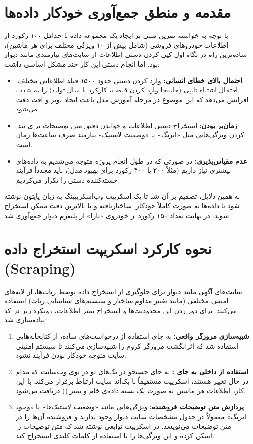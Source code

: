 \documentclass[12pt, a4paper]{article}
\begin{document}
	\section{مقدمه و منطق جمع‌آوری خودکار داده‌ها}
	با توجه به خواسته تمرین مبنی بر ایجاد یک مجموعه داده با حداقل ۱۰۰ رکورد از اطلاعات خودروهای فروشی (شامل بیش از ۱۰ ویژگی مختلف برای هر ماشین)، ساده‌ترین راه در نگاه اول کپی کردن دستی اطلاعات از سایت‌های نیازمندی مانند دیوار بود. اما انجام دستی این کار چند مشکل اساسی داشت:
	\begin{itemize}
		\item \textbf{احتمال بالای خطای انسانی:} وارد کردن دستی حدود ۱۵۰۰ فیلد اطلاعاتی مختلف، احتمال اشتباه تایپی (جابه‌جا وارد کردن قیمت، کارکرد یا سال تولید) را به شدت افزایش می‌دهد که این موضوع در مرحله آموزش مدل باعث ایجاد نویز و افت دقت می‌شود.
		\item \textbf{زمان‌بر بودن:} استخراج دستی اطلاعات و خواندن دقیق متن توضیحات برای پیدا کردن ویژگی‌هایی مثل «ایربگ» یا «وضعیت لاستیک» نیازمند صرف ساعت‌ها زمان است.
		\item \textbf{عدم مقیاس‌پذیری:} در صورتی که در طول انجام پروژه متوجه می‌شدیم به داده‌های بیشتری نیاز داریم (مثلاً ۲۰۰ یا ۳۰۰ رکورد برای بهبود مدل)، باید مجدداً فرآیند خسته‌کننده دستی را تکرار می‌کردیم.
	\end{itemize}
	به همین دلایل، تصمیم بر آن شد تا یک اسکریپت وب‌اسکریپینگ به زبان پایتون نوشته شود تا داده‌ها به صورت کاملاً خودکار، ساختاریافته و با بالاترین دقت ممکن استخراج شوند. در نهایت تعداد ۱۵۰ رکورد از خودروی «تارا» از پلتفرم دیوار جمع‌آوری شد.
	
	\section{نحوه کارکرد اسکریپت استخراج داده (Scraping)}
	سایت‌های آگهی مانند دیوار برای جلوگیری از استخراج داده توسط ربات‌ها، از لایه‌های امنیتی مختلفی (مانند تغییر مداوم ساختار  و سیستم‌های شناسایی ربات) استفاده می‌کنند. برای دور زدن این محدودیت‌ها و استخراج تمیز اطلاعات، رویکرد زیر در کد پیاده‌سازی شد:
	
	\begin{enumerate}
		\item \textbf{شبیه‌سازی مرورگر واقعی:} به جای استفاده از درخواست‌های ساده، از کتابخانه‌هایی استفاده شد که اثرانگشت  مرورگر کروم را شبیه‌سازی می‌کنند تا سیستم امنیتی سایت متوجه خودکار بودن فرآیند نشود.
		\item \textbf{استفاده از  داخلی به جای :} به جای جستجو در تگ‌های تو در توی وب‌سایت که مدام در حال تغییر هستند، اسکریپت مستقیماً با  بک‌اند سایت ارتباط برقرار می‌کند. با این کار، اطلاعات هر ماشین به صورت یک بسته داده‌ی خام و تمیز () دریافت می‌شود.
		\item \textbf{پردازش متن توضیحات فروشنده:} ویژگی‌هایی مانند «وضعیت لاستیک‌ها» یا «وجود ایربگ» معمولاً در جدول مشخصات سایت دیوار وجود ندارند و فروشنده آن‌ها را در متن توضیحات می‌نویسد. در اسکریپت توابعی نوشته شد که متن توضیحات را اسکن کرده و این ویژگی‌ها را با استفاده از کلمات کلیدی استخراج کند.
	\end{enumerate}
	
\end{document}

